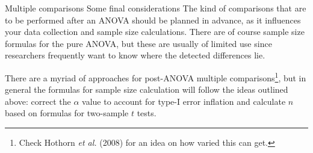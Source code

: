 %
%
%
%
\begin{frame}
{Multiple comparisons}
{Some final considerations}
The kind of comparisons that are to be performed after an ANOVA should be planned in advance, as it influences your data collection and sample size calculations. There are of course sample size formulas for the pure ANOVA, but these are usually of limited use since researchers frequently want to know where the detected differences lie.
\bigskip

There are a myriad of approaches for post-ANOVA multiple comparisons\footnote[5]{\tiny Check Hothorn \textit{et al.} (2008) for an idea on how varied this can get.}, but in general the formulas for sample size calculation will follow the ideas outlined above: correct the $\alpha$ value to account for type-I error inflation and calculate $n$ based on formulas for two-sample $t$ tests.
\end{frame}
%




